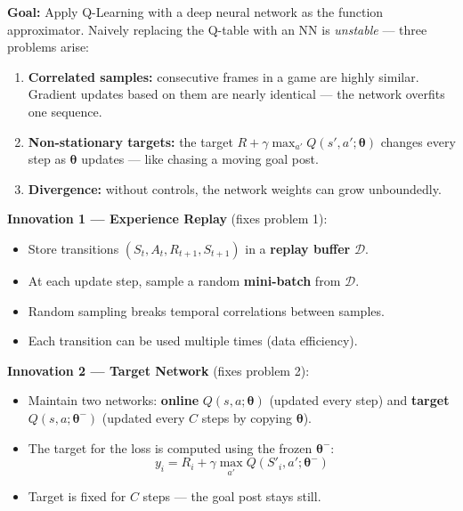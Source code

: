 \documentclass[11pt,a4paper]{article}
\begin{document}
\textbf{Goal:} Apply Q-Learning with a deep neural network as the function approximator.
Naively replacing the Q-table with an NN is \emph{unstable} — three problems arise:

\begin{tcolorbox}[defn={Three Problems with Naive Deep Q-Learning}]
\begin{enumerate}
  \item \textbf{Correlated samples:} consecutive frames in a game are highly similar.
    Gradient updates based on them are nearly identical — the network overfits one sequence.
  \item \textbf{Non-stationary targets:} the target $R + \gamma\max_{a'}Q(s',a';\boldsymbol{\theta})$
    changes every step as $\boldsymbol{\theta}$ updates — like chasing a moving goal post.
  \item \textbf{Divergence:} without controls, the network weights can grow unboundedly.
\end{enumerate}
\end{tcolorbox}

\begin{tcolorbox}[bold={DQN's Two Key Innovations}]

\textbf{Innovation 1 — Experience Replay} (fixes problem 1):
\begin{itemize}
  \item Store transitions $(S_t, A_t, R_{t+1}, S_{t+1})$ in a \textbf{replay buffer} $\mathcal{D}$.
  \item At each update step, sample a random \textbf{mini-batch} from $\mathcal{D}$.
  \item Random sampling breaks temporal correlations between samples.
  \item Each transition can be used multiple times (data efficiency).
\end{itemize}

\medskip
\textbf{Innovation 2 — Target Network} (fixes problem 2):
\begin{itemize}
  \item Maintain two networks: \textbf{online} $Q(s,a;\boldsymbol{\theta})$ (updated every step)
    and \textbf{target} $Q(s,a;\boldsymbol{\theta}^{-})$ (updated every $C$ steps by copying $\boldsymbol{\theta}$).
  \item The target for the loss is computed using the frozen $\boldsymbol{\theta}^{-}$:
  \[
    y_i = R_{i} + \gamma \max_{a'} Q(S'_i, a';\boldsymbol{\theta}^{-})
  \]
  \item Target is fixed for $C$ steps — the goal post stays still.
\end{itemize}
\end{tcolorbox}
\end{document}
